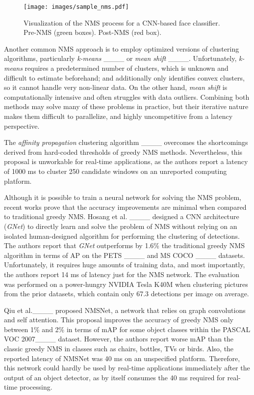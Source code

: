 \begin{figure}[t]
  \centering
  \texttt{[image: images/sample\_nms.pdf]}
  \caption{\label{fig:nmsab} Visualization of the NMS process for a CNN-based face classifier. Pre-NMS (green boxes). Post-NMS (red box).}
\end{figure}

Another common NMS approach is to employ optimized versions of clustering algorithms, particularly \emph{k-means} ____ or 
\emph{mean shift} ____. Unfortunately, \emph{k-means} requires a predetermined number of clusters, which is unknown and difficult to estimate beforehand; 
and additionally only identifies convex clusters, so it cannot handle very non-linear data. On the other hand, \emph{mean shift} is computationally intensive and often 
struggles with data outliers. Combining both methods may solve many of these problems in practice, but their iterative nature makes them difficult to parallelize, and 
highly uncompetitive from a latency perspective.

The \emph{affinity propagation} clustering algorithm ____ overcomes the shortcomings derived from hard-coded thresholds of greedy NMS methods. Nevertheless, 
this proposal is unworkable for real-time applications, as the authors report a latency of 1000 ms to cluster 250 candidate windows on an unreported computing platform.

Although it is possible to train a neural network for solving the NMS problem, recent works prove that the accuracy improvements are minimal when compared 
to traditional greedy NMS. Hosang et al. ____ designed a CNN architecture (\emph{GNet}) to directly learn and solve the problem of 
NMS without relying on an isolated  human-designed algorithm for performing the clustering of detections. The authors report that \emph{GNet} outperforms by 1.6\% the 
traditional greedy NMS algorithm in terms of AP on the PETS ____ and MS COCO ____ datasets. Unfortunately, it requires 
huge amounts of training data, and most importantly, the authors report 14 ms of latency just for the NMS network. The evaluation was performed 
on a power-hungry NVIDIA Tesla K40M when clustering pictures from the prior datasets, which contain only 67.3 detections per image on average.

Qiu et al.____ proposed NMSNet, a network that relies on graph convolutions and self attention. This proposal improves the 
accuracy of greedy NMS only between 1\% and 2\% in terms of mAP for some object classes within the PASCAL VOC 2007____ dataset. However, the authors 
report worse mAP than the classic greedy NMS in classes such as chairs, bottles, TVs or birds. Also, the reported latency of NMSNet was 40 ms on an unspecified platform. 
Therefore, this network could hardly be used by real-time applications immediately after the output of an object detector, as by itself consumes the 40 ms required for 
real-time processing.

